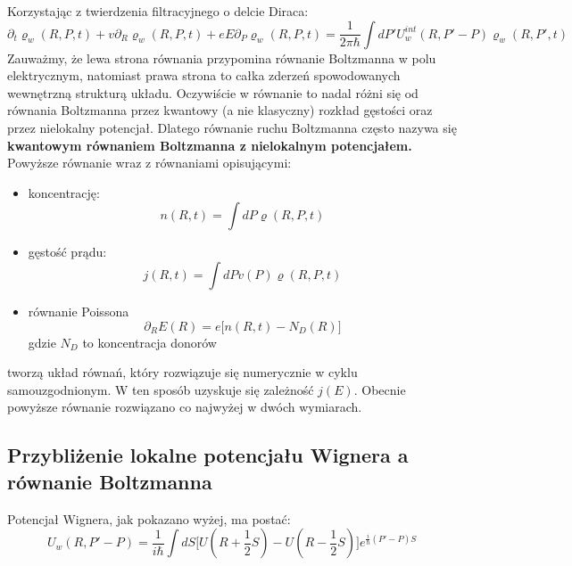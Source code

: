 Korzystając z twierdzenia filtracyjnego o delcie Diraca:
\begin{equation}
\partial_t\varrho_w(R,P,t)+
v\partial_R \varrho_w(R,P,t)+eE\partial_P \varrho_w(R,P,t)=
\frac{1}{2\pi\hbar}\int dP' U_w^{int}(R,P'-P)\varrho_w(R,P',t)
\end{equation}
Zauważmy, że lewa strona równania przypomina równanie Boltzmanna w polu elektrycznym, natomiast prawa strona to całka zderzeń spowodowanych wewnętrzną strukturą układu. 
Oczywiście w równanie to nadal różni się od równania Boltzmanna przez kwantowy (a nie klasyczny) rozkład gęstości oraz przez nielokalny potencjał. Dlatego równanie ruchu Boltzmanna często nazywa się \textbf{kwantowym równaniem Boltzmanna z nielokalnym potencjałem.}\\
Powyższe równanie wraz z równaniami opisującymi:
\begin{itemize}
\item koncentrację:
\begin{equation}
n(R,t)=\int dP \varrho(R,P,t)
\end{equation}
\item gęstość prądu:
\begin{equation}
j(R,t)=\int dP v(P) \varrho(R,P,t)
\end{equation}
\item równanie Poissona
\begin{equation}
\partial_R E(R)=e\Big[n(R,t)-N_D(R)\Big]
\end{equation}
gdzie $N_D$ to koncentracja donorów
\end{itemize}
tworzą układ równań, który rozwiązuje się numerycznie w cyklu samouzgodnionym. W ten sposób uzyskuje się zależność $j(E)$. Obecnie powyższe równanie rozwiązano co najwyżej w dwóch wymiarach.\\
\subsection{Przybliżenie lokalne potencjału Wignera a równanie Boltzmanna}
 Potencjał Wignera, jak pokazano wyżej, ma postać:
\begin{equation}U_w(R,P'-P)=\frac{1}{i\hbar}\int dS\Big[ U(R+\frac{1}{2}S)-U(R-\frac{1}{2}S)\Big] e^{\frac{i}{\hbar}(P'-P)S}\label{UW}
\end{equation}
